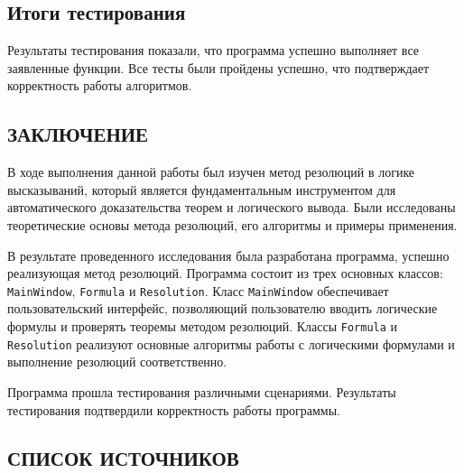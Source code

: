 \documentclass[12pt, a4paper]{article}
\begin{document}
	 \newpage
	  \begin{center}
	 	\subsection{Итоги тестирования}
	 \end{center} 
	 \par Результаты тестирования показали, что программа успешно выполняет все заявленные функции. Все тесты были пройдены успешно, что подтверждает корректность работы алгоритмов.
	 \newpage
	 \begin{center}
	 	\section*{ЗАКЛЮЧЕНИЕ}
	 \end{center}
	 \par В ходе выполнения данной работы был изучен метод резолюций в логике высказываний, который является фундаментальным инструментом для автоматического доказательства теорем и логического вывода. Были исследованы теоретические основы метода резолюций, его алгоритмы и примеры применения.
	 \par В результате проведенного исследования была разработана программа, успешно реализующая метод резолюций. Программа состоит из трех основных классов:\\ \texttt{MainWindow}, \texttt{Formula} и \texttt{Resolution}. Класс \texttt{MainWindow} обеспечивает пользовательский интерфейс, позволяющий пользователю вводить логические формулы и проверять теоремы методом резолюций. Классы \texttt{Formula} и \texttt{Resolution} реализуют основные алгоритмы работы с логическими формулами и выполнение резолюций соответственно.
	 \par Программа прошла тестирования различными сценариями. Результаты тестирования подтвердили корректность работы программы.
	  \newpage
	 \begin{center}
	 	\section*{СПИСОК ИСТОЧНИКОВ}
	 \end{center}
\end{document}
